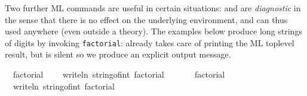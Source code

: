 \begin{isabellebody}
\begin{isamarkuptext}
  \medskip Two further ML commands are useful in certain situations:
  \hyperlink{command.ML-val}{\mbox{}} and \hyperlink{command.ML-command}{\mbox{}} are
  \emph{diagnostic} in the sense that there is no effect on the
  underlying environment, and can thus used anywhere (even outside a
  theory).  The examples below produce long strings of digits by
  invoking \verb|factorial|: \hyperlink{command.ML-val}{\mbox{}} already takes care of
  printing the ML toplevel result, but \hyperlink{command.ML-command}{\mbox{}} is silent
  so we produce an explicit output message.%
\end{isamarkuptext}%
\isamarkuptrue%
%
\isadelimML
%
\endisadelimML
%
\isatagML
{}\isamarkupfalse%
\ {}\ factorial\ {}{}{}\ {}\isanewline
{}\isamarkupfalse%
\ {}\ writeln\ {}string{}of{}int\ {}factorial\ {}{}{}{}{}\ {}%
\endisatagML
{\isafoldML}%
%
\isadelimML
%
\endisadelimML
\isanewline
\isanewline
{}\isamarkupfalse%
\isanewline
{}\isanewline
%
\isadelimML
\ \ %
\endisadelimML
%
\isatagML
{}\isamarkupfalse%
\ {}\ factorial\ {}{}{}\ {}\ \ \isanewline
\ \ \isamarkupfalse%
\ {}\ writeln\ {}string{}of{}int\ {}factorial\ {}{}{}{}{}\ {}%

\end{isabellebody}
